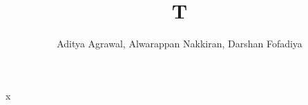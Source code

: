 \documentclass[sigconf,nonacm]{acmart}
\begin{document}
\title{T}
\author{Aditya Agrawal, Alwarappan Nakkiran, Darshan Fofadiya}
\maketitle
x
\end{document}
